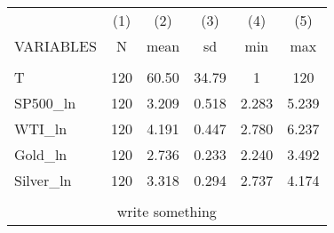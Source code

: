 \documentclass[]{article}
\begin{document}
\begin{tabular}{lccccc} \hline
 & (1) & (2) & (3) & (4) & (5) \\
VARIABLES & N & mean & sd & min & max \\ \hline
 &  &  &  &  &  \\
T & 120 & 60.50 & 34.79 & 1 & 120 \\
SP500\_ln & 120 & 3.209 & 0.518 & 2.283 & 5.239 \\
WTI\_ln & 120 & 4.191 & 0.447 & 2.780 & 6.237 \\
Gold\_ln & 120 & 2.736 & 0.233 & 2.240 & 3.492 \\
Silver\_ln & 120 & 3.318 & 0.294 & 2.737 & 4.174 \\
 &  &  &  &  &  \\ \hline
\multicolumn{6}{c}{ write something} \\
\end{tabular}
\end{document}
